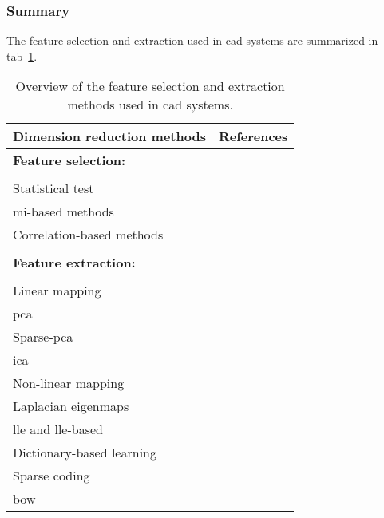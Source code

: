 \subsubsection{Summary}

The feature selection and extraction used in \ac{cad} systems are summarized in
\acs{tab}~\ref{tab:featext}.

\begin{table}
  \caption{Overview of the feature selection and extraction methods used in \acs*{cad} systems.}
  \centering
  \begin{tabular}{l r}
    \toprule
    \textbf{Dimension reduction methods} & \textbf{References} \\
    \midrule
    \textbf{Feature selection:} & \\ \\ [-1.5ex]
    \quad Statistical test & \cite{Niaf2011,Niaf2012,Vos2012,Lemaitre2016thesis} \\
    \quad \ac{mi}-based methods & \cite{Niaf2011,Niaf2012,Vos2008,lehaire2014computer,khalvati2015automated,chung2015prostate,Lemaitre2016thesis} \\
    \quad Correlation-based methods & \cite{rampun2016computer,rampun2015computer} \\ \\ [-1.5ex]
    \textbf{Feature extraction:} & \\ \\ [-1.5ex]
    \quad Linear mapping & \\
    \quad \quad \acs*{pca} & \cite{Tiwari2008,Tiwari2009} \\
    \quad \quad Sparse-\acs*{pca} & \cite{Lemaitre2016thesis} \\
    \quad \quad \acs*{ica} & \cite{Lemaitre2016thesis} \\
    \quad Non-linear mapping & \\
    \quad \quad Laplacian eigenmaps & \cite{Tiwari2007,Tiwari2009a,Tiwari2009,Tiwari2010,Viswanath2008,Viswanath2011} \\
    \quad \quad \acs*{lle} and \acs*{lle}-based & \cite{Tiwari2008,Tiwari2009,Viswanath2008a,Viswanath2008} \\
    \quad Dictionary-based learning & \\
    \quad \quad Sparse coding & \cite{lehaire2014computer} \\
    \quad \quad \acs*{bow} & \cite{rampun2016computerb,rampun2015classifying} \\
    \bottomrule
  \end{tabular}
  \label{tab:featext}
\end{table}
